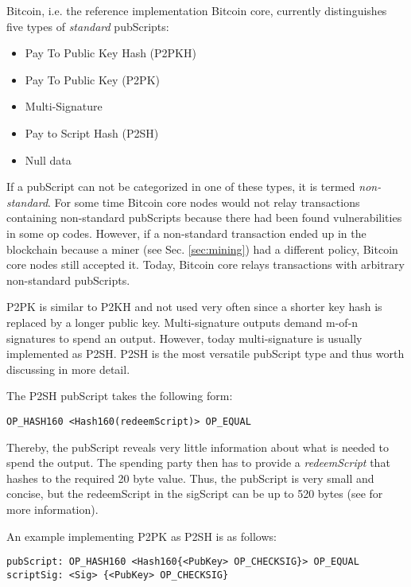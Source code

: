 Bitcoin, i.e. the reference implementation Bitcoin core, currently distinguishes five types of \emph{standard} pubScripts:

\begin{itemize}
\item Pay To Public Key Hash (P2PKH)
\item Pay To Public Key (P2PK)
\item Multi-Signature 
\item Pay to Script Hash (P2SH)
\item Null data
\end{itemize}

If a pubScript can not be categorized in one of these types, it is termed \emph{non-standard}. For some time Bitcoin core nodes would not relay transactions containing non-standard pubScripts because there had been found vulnerabilities in some op codes. However, if a non-standard transaction ended up in the blockchain because a miner  (see Sec. \ref{sec:mining}) had a different policy, Bitcoin core nodes still accepted it. Today, Bitcoin core relays transactions with arbitrary non-standard pubScripts.

P2PK is similar to P2KH and not used very often since a shorter key hash is replaced by a longer public key. Multi-signature outputs demand m-of-n signatures to spend an output. However, today multi-signature is usually implemented as P2SH. P2SH is the most versatile pubScript type and thus worth discussing in more detail.

The P2SH pubScript takes the following form:

\begin{lstlisting}
OP_HASH160 <Hash160(redeemScript)> OP_EQUAL
\end{lstlisting}

Thereby, the pubScript reveals very little information about what is needed to spend the output. The spending party then has to provide a \emph{redeemScript} that hashes to the required 20 byte value. Thus, the pubScript is very small and concise, but the redeemScript in the sigScript can be up to 520 bytes (see \cite{bip16} for more information). 

An example implementing P2PK as P2SH is as follows:

\begin{lstlisting}[breaklines]
pubScript: OP_HASH160 <Hash160{<PubKey> OP_CHECKSIG}> OP_EQUAL
scriptSig: <Sig> {<PubKey> OP_CHECKSIG}
\end{lstlisting}

